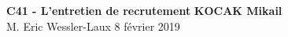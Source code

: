 \noindent
\large\textbf{C41 - L'entretien de recrutement} \hfill \textbf{KOCAK Mikail} \\
\normalsize M. Eric Wessler-Laux \hfill 8 février 2019 \\[1pt]
